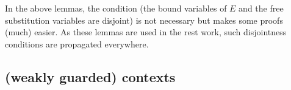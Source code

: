In the above lemmas, the condition
 (the bound
variables of $E$ and the free substitution variables are disjoint) is
not necessary but makes some proofs (much) easier. 
As these lemmas are
used in the rest work, such disjointness conditions 
are propagated everywhere. 

\subsection{\Multivariate (weakly guarded) contexts}

